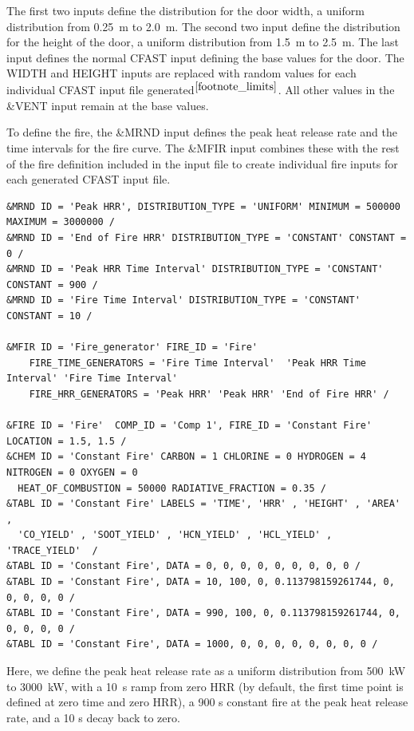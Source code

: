 \documentclass[12pt,twoside]{book}
\begin{document}
The first two inputs define the distribution for the door width, a uniform distribution from 0.25~m to 2.0~m. The second two input define the distribution for the height of the door, a uniform distribution from 1.5~m to 2.5~m. The last input defines the normal CFAST input defining the base values for the door. The {\ct WIDTH} and {\ct HEIGHT} inputs are replaced with random values for each individual CFAST input file generated$^{\ref{footnote_limits}}$. All other values in the {\ct \&VENT} input remain at the base values.

To define the fire, the {\ct \&MRND} input defines the peak heat release rate and the time intervals for the fire curve. The {\ct \&MFIR} input combines these with the rest of the fire definition included in the input file to create individual fire inputs for each generated CFAST input file.

\begin{lstlisting}[language=cdata, basicstyle=\scriptsize]
&MRND ID = 'Peak HRR', DISTRIBUTION_TYPE = 'UNIFORM' MINIMUM = 500000 MAXIMUM = 3000000 /
&MRND ID = 'End of Fire HRR' DISTRIBUTION_TYPE = 'CONSTANT' CONSTANT = 0 /
&MRND ID = 'Peak HRR Time Interval' DISTRIBUTION_TYPE = 'CONSTANT' CONSTANT = 900 /
&MRND ID = 'Fire Time Interval' DISTRIBUTION_TYPE = 'CONSTANT' CONSTANT = 10 /

&MFIR ID = 'Fire_generator' FIRE_ID = 'Fire'
    FIRE_TIME_GENERATORS = 'Fire Time Interval'  'Peak HRR Time Interval' 'Fire Time Interval'
    FIRE_HRR_GENERATORS = 'Peak HRR' 'Peak HRR' 'End of Fire HRR' /

&FIRE ID = 'Fire'  COMP_ID = 'Comp 1', FIRE_ID = 'Constant Fire'  LOCATION = 1.5, 1.5 /
&CHEM ID = 'Constant Fire' CARBON = 1 CHLORINE = 0 HYDROGEN = 4 NITROGEN = 0 OXYGEN = 0
  HEAT_OF_COMBUSTION = 50000 RADIATIVE_FRACTION = 0.35 /
&TABL ID = 'Constant Fire' LABELS = 'TIME', 'HRR' , 'HEIGHT' , 'AREA' ,
  'CO_YIELD' , 'SOOT_YIELD' , 'HCN_YIELD' , 'HCL_YIELD' , 'TRACE_YIELD'  /
&TABL ID = 'Constant Fire', DATA = 0, 0, 0, 0, 0, 0, 0, 0, 0 /
&TABL ID = 'Constant Fire', DATA = 10, 100, 0, 0.113798159261744, 0, 0, 0, 0, 0 /
&TABL ID = 'Constant Fire', DATA = 990, 100, 0, 0.113798159261744, 0, 0, 0, 0, 0 /
&TABL ID = 'Constant Fire', DATA = 1000, 0, 0, 0, 0, 0, 0, 0, 0 /
\end{lstlisting}

Here, we define the peak heat release rate as a uniform distribution from 500~kW to 3000~kW, with a 10~s ramp from zero HRR (by default, the first time point is defined at zero time and zero HRR), a 900 s constant fire at the peak heat release rate, and a 10 s decay back to zero.
\end{document}
